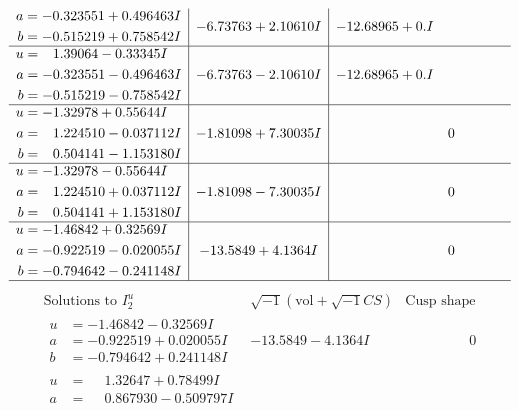 \documentclass[1p]{elsarticle_modified}
\theoremstyle{definition}
\newcommand{\I}{\sqrt{-1}}
\begin{document}
$$\begin{array}{c|c|c}
\begin{aligned}
a &= -0.323551 + 0.496463 I \\
b &= -0.515219 + 0.758542 I\end{aligned}
 & -6.73763 + 2.10610 I & -12.68965 + 0. I\phantom{ +0.000000I} \\ \hline\begin{aligned}
u &= \phantom{-}1.39064 - 0.33345 I \\
a &= -0.323551 - 0.496463 I \\
b &= -0.515219 - 0.758542 I\end{aligned}
 & -6.73763 - 2.10610 I & -12.68965 + 0. I\phantom{ +0.000000I} \\ \hline\begin{aligned}
u &= -1.32978 + 0.55644 I \\
a &= \phantom{-}1.224510 - 0.037112 I \\
b &= \phantom{-}0.504141 - 1.153180 I\end{aligned}
 & -1.81098 + 7.30035 I & \phantom{-0.000000 } 0 \\ \hline\begin{aligned}
u &= -1.32978 - 0.55644 I \\
a &= \phantom{-}1.224510 + 0.037112 I \\
b &= \phantom{-}0.504141 + 1.153180 I\end{aligned}
 & -1.81098 - 7.30035 I & \phantom{-0.000000 } 0 \\ \hline\begin{aligned}
u &= -1.46842 + 0.32569 I \\
a &= -0.922519 - 0.020055 I \\
b &= -0.794642 - 0.241148 I\end{aligned}
 & -13.5849 + 4.1364 I & \phantom{-0.000000 } 0\\
 \hline 
 \end{array}$$\newpage$$\begin{array}{c|c|c}  
\text{Solutions to }I^u_{2}& \I (\text{vol} + \sqrt{-1}CS) & \text{Cusp shape}\\
 \hline 
\begin{aligned}
u &= -1.46842 - 0.32569 I \\
a &= -0.922519 + 0.020055 I \\
b &= -0.794642 + 0.241148 I\end{aligned}
 & -13.5849 - 4.1364 I & \phantom{-0.000000 } 0 \\ \hline\begin{aligned}
u &= \phantom{-}1.32647 + 0.78499 I \\
a &= \phantom{-}0.867930 - 0.509797 I \\

\end{aligned}
\end{array}$$
\end{document}

